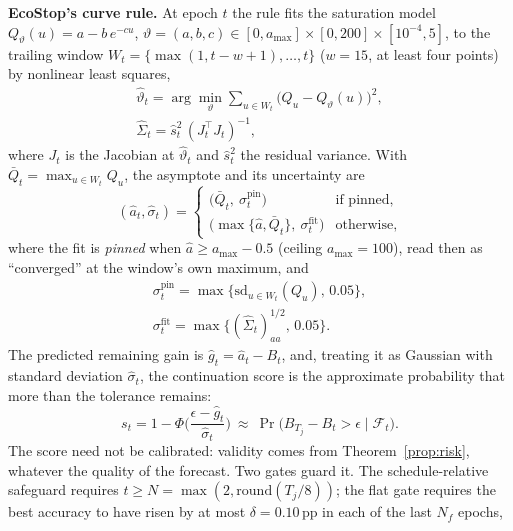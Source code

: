 \documentclass[3p,twocolumn,10pt]{elsarticle}
\theoremstyle{definition}
\begin{document}
\textbf{EcoStop's curve rule.} At epoch $t$ the rule fits the saturation model $Q_\vartheta(u)=a-b\,e^{-cu}$, $\vartheta=(a,b,c)\in[0,a_{\max}]\times[0,200]\times[10^{-4},5]$, to the trailing window $W_t=\{\max(1,t-w+1),\dots,t\}$ ($w=15$, at least four points) by nonlinear least squares,
\begin{equation}
\begin{gathered}
\hat\vartheta_t=\arg\min_{\vartheta}\sum_{u\in W_t}\big(Q_u-Q_\vartheta(u)\big)^2,\\
\hat\Sigma_t=\hat s^2_t\,(J_t^\top J_t)^{-1},
\end{gathered}
\label{eq:fit}
\end{equation}
where $J_t$ is the Jacobian at $\hat\vartheta_t$ and $\hat s^2_t$ the residual variance. With $\bar Q_t=\max_{u\in W_t}Q_u$, the asymptote and its uncertainty are
\begin{equation}
(\hat a_t,\hat\sigma_t)=\begin{cases}
\big(\bar Q_t,\ \sigma^{\mathrm{pin}}_t\big) & \text{if pinned},\\
\big(\max\{\hat a,\bar Q_t\},\ \sigma^{\mathrm{fit}}_t\big) & \text{otherwise},
\end{cases}
\label{eq:asym}
\end{equation}
where the fit is \emph{pinned} when $\hat a\ge a_{\max}-0.5$ (ceiling $a_{\max}=100$), read then as ``converged'' at the window's own maximum, and
\begin{equation}
\begin{gathered}
\sigma^{\mathrm{pin}}_t=\max\{\mathrm{sd}_{u\in W_t}(Q_u),\,0.05\},\\
\sigma^{\mathrm{fit}}_t=\max\{(\hat\Sigma_t)_{aa}^{1/2},\,0.05\}.
\end{gathered}
\label{eq:sigmas}
\end{equation} The predicted remaining gain is $\hat g_t=\hat a_t-B_t$, and, treating it as Gaussian with standard deviation $\hat\sigma_t$, the continuation score is the approximate probability that more than the tolerance remains:
\begin{equation}
s_t=1-\Phi\!\Big(\frac{\epsilon-\hat g_t}{\hat\sigma_t}\Big)\ \approx\ \Pr\big(B_{T_j}-B_t>\epsilon\mid\mathcal{F}_t\big).
\label{eq:score}
\end{equation}
The score need not be calibrated: validity comes from Theorem~\ref{prop:risk}, whatever the quality of the forecast. Two gates guard it. The schedule-relative safeguard requires $t\ge N=\max(2,\mathrm{round}(T_j/8))$; the flat gate requires the best accuracy to have risen by at most $\delta=0.10$\,pp in each of the last $N_f$ epochs,
\end{document}
